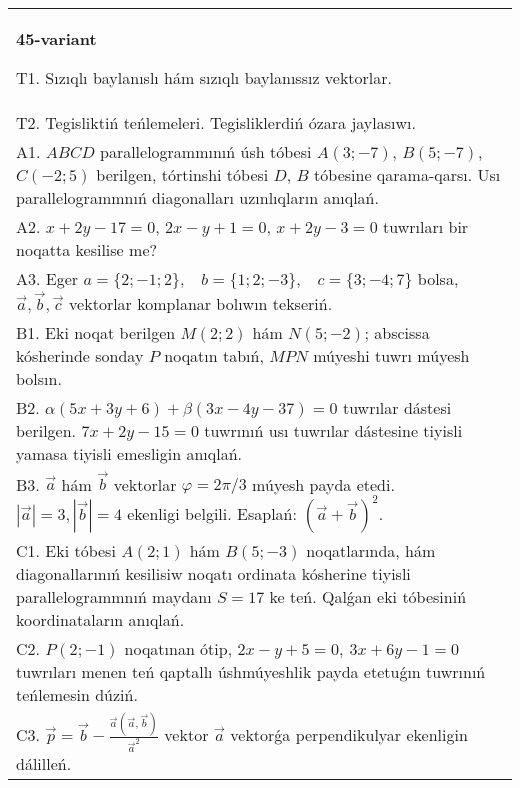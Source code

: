 \documentclass{article}
\begin{document}
\begin{tabular}{m{17cm}}
\textbf{45-variant}
\newline

T1. 
Sızıqlı baylanıslı hám sızıqlı baylanıssız vektorlar.
 \\
T2. 
Tegisliktiń teńlemeleri. Tegisliklerdiń ózara jaylasıwı.
 \\
A1. 
$ABCD$ parallelogrammınıń úsh tóbesi $A(3; -7)$, 
$B(5; -7)$, $C(-2; 5)$ berilgen, tórtinshi tóbesi $D$, 
$B$ tóbesine qarama-qarsı. Usı parallelogrammnıń diagonalları
uzınlıqların anıqlań.
 \\
A2. 
$x+2y-17=0$, $2x-y+1=0$, $x+2y-3=0$ 
tuwrıları bir noqatta kesilise me?
 \\
A3. 
Eger \(a = \{ 2; - 1;2\},\ \ \ \ b = \{ 1;2; - 3\},\ \ \ \ c = \{ 3; - 4;7\}\) bolsa, $\overrightarrow{a}, \overrightarrow{b}, \overrightarrow{c}$ vektorlar komplanar bolıwın tekseriń. \\
B1. 
Eki noqat berilgen \(M(2;2)\) hám \(N(5;-2)\); abscissa kósherinde sonday $P$ noqatın tabıń, $MPN$ múyeshi tuwrı múyesh bolsın.
 \\
B2. 
\(\alpha(5x+3y+6)+\beta(3x-4y-37)=0\) tuwrılar
dástesi berilgen. \(7x+2y-15=0\) tuwrınıń usı tuwrılar dástesine
tiyisli yamasa tiyisli emesligin anıqlań.
 \\
B3. 
$\vec{a}$ hám $\vec{b}$ vektorlar $\varphi = 2\pi/3$ múyesh payda etedi. $|\vec{a}| = 3,|\vec{b}| = 4$ ekenligi belgili. Esaplań: 
$(\vec{a} + \vec{b}) ^{2}$.
 \\
C1. 
Eki tóbesi \(A(2;1)\) hám \(B(5; - 3)\) noqatlarında, hám
diagonallarınıń kesilisiw noqatı ordinata kósherine tiyisli
parallelogrammnıń maydanı \(S = 17\) ke teń. Qalǵan eki tóbesiniń
koordinataların anıqlań. \\
C2. 
\(P(2; - 1)\) noqatınan ótip,
\(2x - y + 5 = 0,\ 3x + 6y - 1 = 0\) tuwrıları menen teń qaptallı
úshmúyeshlik payda etetuǵın tuwrınıń teńlemesin dúziń.
 \\
C3. 
\(\vec{p} = \vec{b} - \frac{\vec{a} (\vec{a},\vec{b}) }{{\vec{a}}^{2}}\) vektor \(\vec{a}\) vektorǵa perpendikulyar ekenligin dálilleń.
 \\

\end{tabular}
\vspace{1cm}
\end{document}
